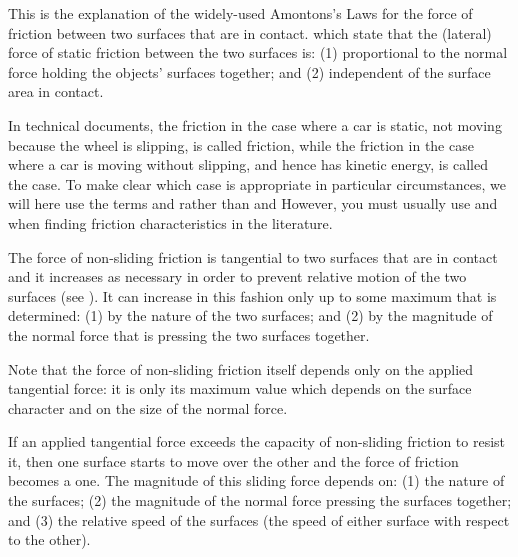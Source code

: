 {
This is the explanation of the widely-used Amontons's Laws for the force of friction between
two surfaces
%
%
that are in contact.
%
%
which state that the (lateral) force of static friction between the two surfaces is:
(1) proportional to the normal force holding the objects' surfaces together; and
(2) independent of the surface area in contact. 

In technical documents, the friction in the case where a car is static, not
moving because the wheel is slipping, is called  friction,
 while
the friction in the case where a car is moving without slipping, and hence
has kinetic energy, is called the  case.
To make clear which case is appropriate in particular circumstances, we will
here use the terms  and  rather than 
and 
However, you must usually use  and  when finding friction characteristics
in the literature.


The force of non-sliding friction is tangential to two surfaces that are in
contact and it increases as necessary in order to prevent relative motion of
the two surfaces (see ).
It can increase in this fashion only up to some maximum that is determined:
(1) by the nature of the two surfaces; and (2) by the magnitude of the
normal force that is pressing the two surfaces together.

Note that the force of non-sliding friction itself depends only on the
applied tangential force: it is only its maximum value which depends on the
surface character and on the size of the normal force.

If an applied tangential force exceeds the capacity of non-sliding friction
to resist it, then one surface starts to move over the other and the force
of friction becomes a  one.
The magnitude of this sliding force depends on: (1) the nature of
the surfaces; (2) the magnitude of the normal force pressing the surfaces
together; and (3) the relative speed of the surfaces (the speed
of either surface with respect to the other).

}

